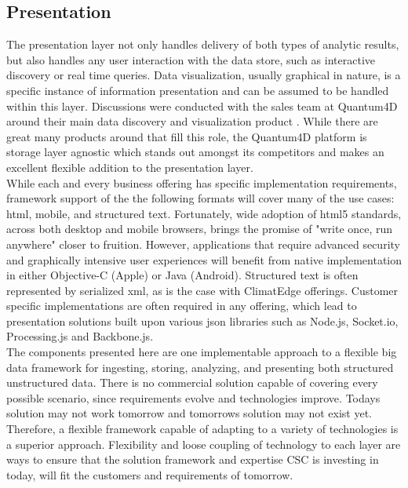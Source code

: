 \subsection{Presentation}
The presentation layer not only handles delivery of both types of analytic results, but also handles any user interaction with the data store, such as interactive discovery or real time queries. Data visualization, usually graphical in nature,  is a specific instance of information presentation and can be assumed to be handled within this layer. Discussions were conducted with the sales team at Quantum4D around their main data discovery and visualization product \cite{quantum}. While there are great many products around that fill this role, the Quantum4D platform is storage layer agnostic which stands out amongst its competitors and makes an excellent flexible addition to the presentation layer.\\

 While each and every business offering has specific implementation requirements, framework support of the the following formats will cover many of the use cases: \gls{html}, mobile, and structured text. Fortunately, wide adoption of \gls{html}5 standards, across both desktop and mobile browsers, brings the promise of "write once, run anywhere" closer to fruition. However, applications that require advanced security and graphically intensive user experiences will benefit from native implementation in either Objective-C (Apple) or Java (Android). Structured text is often represented by serialized \gls{xml}, as is the case with ClimatEdge\texttrademark{} offerings. Customer specific implementations are often required in any offering, which lead to presentation solutions built upon various \gls{json} libraries such as Node.js, Socket.io, Processing.js and Backbone.js.\\

The components presented here are one implementable approach to a flexible big data framework for ingesting, storing, analyzing, and presenting both structured unstructured data. There is no commercial solution capable of covering every possible scenario, since requirements evolve and technologies improve. Todays solution may not work tomorrow and tomorrows solution may not exist yet. Therefore, a flexible framework capable of adapting to a variety of technologies is a superior approach. Flexibility and loose coupling of technology to each layer are ways to ensure that the solution framework and expertise \textsc{CSC} is investing in today, will fit the customers and requirements of tomorrow.